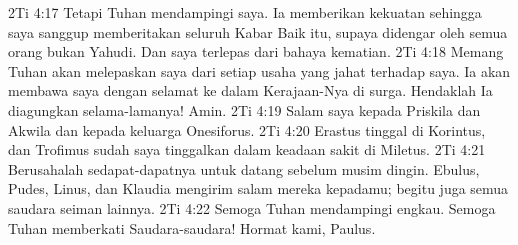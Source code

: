 2Ti 4:17  Tetapi Tuhan mendampingi saya. Ia memberikan kekuatan sehingga saya sanggup memberitakan seluruh Kabar Baik itu, supaya didengar oleh semua orang bukan Yahudi. Dan saya terlepas dari bahaya kematian.
2Ti 4:18  Memang Tuhan akan melepaskan saya dari setiap usaha yang jahat terhadap saya. Ia akan membawa saya dengan selamat ke dalam Kerajaan-Nya di surga. Hendaklah Ia diagungkan selama-lamanya! Amin.
2Ti 4:19  Salam saya kepada Priskila dan Akwila dan kepada keluarga Onesiforus.
2Ti 4:20  Erastus tinggal di Korintus, dan Trofimus sudah saya tinggalkan dalam keadaan sakit di Miletus.
2Ti 4:21  Berusahalah sedapat-dapatnya untuk datang sebelum musim dingin. Ebulus, Pudes, Linus, dan Klaudia mengirim salam mereka kepadamu; begitu juga semua saudara seiman lainnya.
2Ti 4:22  Semoga Tuhan mendampingi engkau. Semoga Tuhan memberkati Saudara-saudara! Hormat kami, Paulus.


